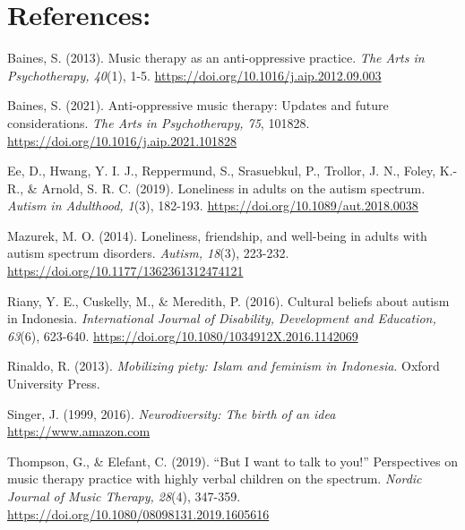 \documentclass[authordate, empirical, issue]{jote-new-article}
\begin{document}
\section{References:}



\hspace*{\parindent}Baines, S. (2013). Music therapy as an anti-oppressive practice. \emph{The Arts in Psychotherapy, 40}(1), 1-5. \href{https://doi.org/10.1016/j.aip.2012.09.003}{https://doi.org/10.1016/j.aip.2012.09.003}







Baines, S. (2021). Anti-oppressive music therapy: Updates and future considerations. \emph{The Arts in Psychotherapy, 75}, 101828. \href{https://doi.org/10.1016/j.aip.2021.101828}{https://doi.org/10.1016/j.aip.2021.101828}







Ee, D., Hwang, Y. I. J., Reppermund, S., Srasuebkul, P., Trollor, J. N., Foley, K.-R., \& Arnold, S. R. C. (2019). Loneliness in adults on the autism spectrum. \emph{Autism in Adulthood, 1}(3), 182-193. \href{https://doi.org/10.1089/aut.2018.0038}{https://doi.org/10.1089/aut.2018.0038}







Mazurek, M. O. (2014). Loneliness, friendship, and well-being in adults with autism spectrum disorders. \emph{Autism, 18}(3), 223-232. \href{https://doi.org/10.1177/1362361312474121}{https://doi.org/10.1177/1362361312474121}







Riany, Y. E., Cuskelly, M., \& Meredith, P. (2016). Cultural beliefs about autism in Indonesia. \emph{International Journal of Disability, Development and Education, 63}(6), 623-640. \href{https://doi.org/10.1080/1034912X.2016.1142069}{https://doi.org/10.1080/1034912X.2016.1142069}







Rinaldo, R. (2013). \emph{Mobilizing piety: Islam and feminism in Indonesia}. Oxford University Press.







Singer, J. (1999, 2016). \emph{Neurodiversity: The birth of an idea} \href{https://www.amazon.com}{https://www.amazon.com}







Thompson, G., \& Elefant, C. (2019). “But I want to talk to you!” Perspectives on music therapy practice with highly verbal children on the spectrum. \emph{Nordic Journal of Music Therapy, 28}(4), 347-359. \href{https://doi.org/10.1080/08098131.2019.1605616}{https://doi.org/10.1080/08098131.2019.1605616}
\end{document}
